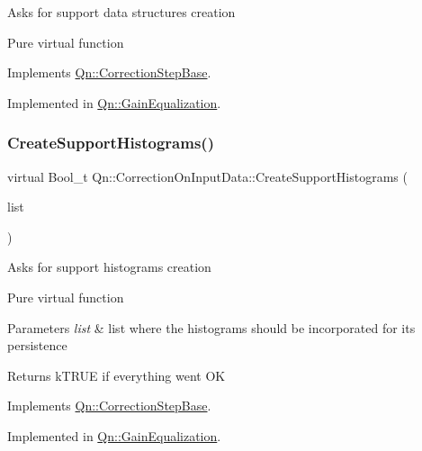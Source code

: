 Asks for support data structures creation

Pure virtual function 

Implements \mbox{\hyperlink{classQn_1_1CorrectionStepBase_a800ac634950eb231d72033b03cc899cd}{Qn\+::\+Correction\+Step\+Base}}.



Implemented in \mbox{\hyperlink{classQn_1_1GainEqualization_a3b1da6e8711ef1e7dea394d3612ee8f9}{Qn\+::\+Gain\+Equalization}}.

\mbox{\label{classQn_1_1CorrectionOnInputData_a1556dd574545ef77d6b462020101bf39}} 
\subsubsection{\texorpdfstring{Create\+Support\+Histograms()}{CreateSupportHistograms()}}
{\footnotesize\ttfamily virtual Bool\+\_\+t Qn\+::\+Correction\+On\+Input\+Data\+::\+Create\+Support\+Histograms (\begin{DoxyParamCaption}\item[{T\+List $\ast$}]{list }\end{DoxyParamCaption})\hspace{0.3cm}{\ttfamily [pure virtual]}}

Asks for support histograms creation

Pure virtual function 
\begin{DoxyParams}{Parameters}
{\em list} & list where the histograms should be incorporated for its persistence \\
\hline
\end{DoxyParams}
\begin{DoxyReturn}{Returns}
k\+T\+R\+UE if everything went OK 
\end{DoxyReturn}


Implements \mbox{\hyperlink{classQn_1_1CorrectionStepBase_a156c05dc7a6a8e149674ccfb11e596c9}{Qn\+::\+Correction\+Step\+Base}}.



Implemented in \mbox{\hyperlink{classQn_1_1GainEqualization_a3f34cc42fe078c556d9acf98525490ce}{Qn\+::\+Gain\+Equalization}}.

\mbox{\label{classQn_1_1CorrectionOnInputData_a9072c5ffae945c464bed4ee3e60858a4}} 
